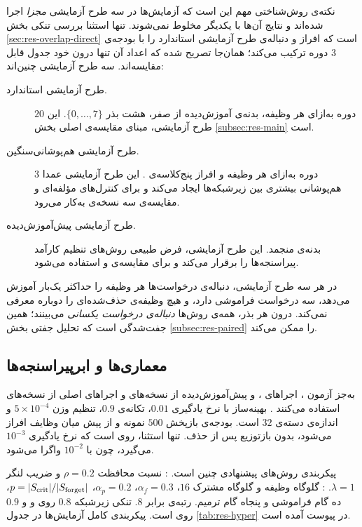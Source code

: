 نکته‌ی روش‌شناختی مهم این است که آزمایش‌ها در سه طرح آزمایشی \emph{مجزا} اجرا شده‌اند و نتایج آن‌ها با یکدیگر مخلوط نمی‌شوند. تنها استثنا بررسی تنکی بخش \ref{sec:res-overlap-direct} است که افراز و دنباله‌ی طرح آزمایشی استاندارد را با بودجه‌ی $3$ دوره ترکیب می‌کند؛ همان‌جا تصریح شده که اعداد آن تنها درون خود جدول قابل مقایسه‌اند. سه طرح آزمایشی چنین‌اند:

\begin{description}
	\item[طرح آزمایشی استاندارد.] $20$ دوره به‌ازای هر وظیفه، بدنه‌ی آموزش‌دیده از صفر، هشت بذر $\{0,\ldots,7\}$. این طرح آزمایشی، مبنای مقایسه‌ی اصلی بخش \ref{subsec:res-main} است.
	\item[طرح آزمایشی هم‌پوشانی‌سنگین.] $3$ دوره به‌ازای هر وظیفه و افراز پنج‌کلاسه‌ی . این طرح آزمایشی عمدا هم‌پوشانی بیشتری بین زیرشبکه‌ها ایجاد می‌کند و برای کنترل‌های مؤلفه‌ای  و مقایسه‌ی سه نسخه‌ی  به‌کار می‌رود.
	\item[طرح آزمایشی پیش‌آموزش‌دیده.] بدنه‌ی  \cite{deng2009imagenet} منجمد. این طرح آزمایشی، فرض طبیعی روش‌های تنظیم کارآمد پیراسنجه‌ها را برقرار می‌کند و برای مقایسه‌ی  و  استفاده می‌شود.
\end{description}

در هر سه طرح آزمایشی، دنباله‌ی درخواست‌ها هر وظیفه را حداکثر یک‌بار آموزش می‌دهد، سه درخواست فراموشی دارد، و هیچ وظیفه‌ی حذف‌شده‌ای را دوباره معرفی نمی‌کند. درون هر بذر، همه‌ی روش‌ها \emph{دنباله‌ی درخواست یکسانی} می‌بینند؛ همین جفت‌شدگی است که تحلیل جفتی بخش \ref{subsec:res-paired} را ممکن می‌کند.

\subsection{معماری‌ها و ابرپیراسنجه‌ها}
\label{subsec:res-hyper}

به‌جز آزمون ، اجراهای ،  و پیش‌آموزش‌دیده از نسخه‌های  و اجراهای اصلی  از نسخه‌های  استفاده می‌کنند \cite{he2016deep}. بهینه‌ساز  \cite{robbins1951sgd} با نرخ یادگیری $0.01$، تکانه‌ی $0.9$، تنظیم وزن $5\times10^{-4}$ و اندازه‌ی دسته‌ی $32$ است. بودجه‌ی بازپخش $500$ نمونه و از پیش میان وظایف افراز می‌شود، بدون بازتوزیع پس از حذف. تنها استثنا،  روی  است که نرخ یادگیری $10^{-3}$ می‌گیرد، چون با $10^{-2}$ واگرا می‌شود.

پیکربندی روش‌های پیشنهادی چنین است. : نسبت محافظت $\rho=0.2$ و ضریب لنگر $\lambda=1$. : گلوگاه وظیفه و گلوگاه مشترک $16$، $\alpha_f=0.3$، $\alpha_p=0.2$، $p=|S_{\mathrm{crit}}|/|S_{\mathrm{forget}}|$، ده گام فراموشی و پنجاه گام ترمیم. رتبه‌ی  برابر $8$. تنکی زیرشبکه $0.8$ روی  و  و $0.9$ روی  است. پیکربندی کامل آزمایش‌ها در جدول \ref{tab:res-hyper} در پیوست آمده است.

